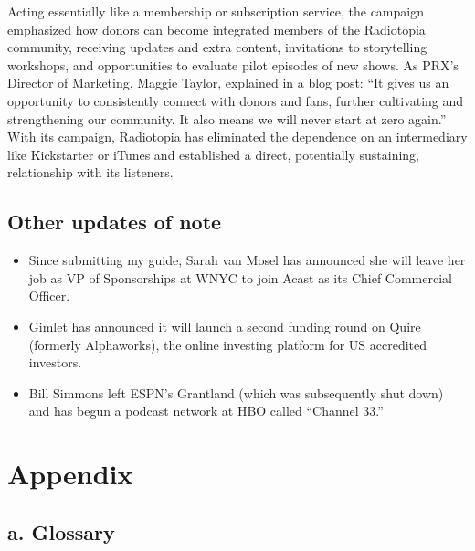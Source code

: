 \documentclass[notoc, symmetric, nobib, nols]{towcenter-guideto-book}
\begin{document}
Acting essentially like a membership or subscription service, the campaign emphasized how donors can become integrated members of the Radiotopia community, receiving updates and extra content, invitations to storytelling workshops, and opportunities to evaluate pilot episodes of new shows. As PRX's Director of Marketing, Maggie Taylor, explained in a blog post: ``It gives us an opportunity to consistently connect with donors and fans, further cultivating and strengthening our community. It also means we will never start at zero again.'' With its campaign, Radiotopia has eliminated the dependence on an intermediary like Kickstarter or iTunes and established a direct, potentially sustaining, relationship with its listeners. 

\section{Other updates of note}
\begin{itemize}
\item Since submitting my guide, Sarah van Mosel has announced she will leave her job as VP of Sponsorships at WNYC to join Acast as its Chief Commercial Officer. 
\item Gimlet has announced it will launch a second funding round on Quire (formerly Alphaworks), the online investing platform for US accredited investors.
\item Bill Simmons left ESPN's Grantland (which was subsequently shut down) and has begun a podcast network at HBO called ``Channel 33.''
\end{itemize}


\chapter{Appendix}

\section{a. Glossary}
\end{document}
